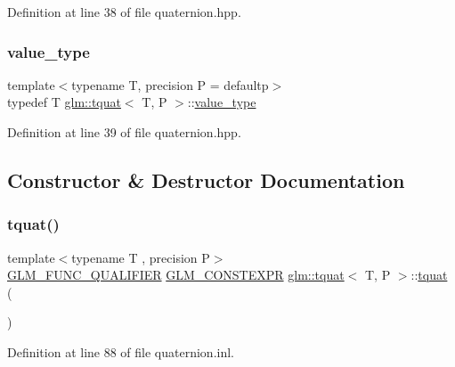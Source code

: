 Definition at line 38 of file quaternion.\+hpp.

\mbox{\label{structglm_1_1tquat_ab335d431872cb11fb3b5e2476adc32d8}} 
\subsubsection{\texorpdfstring{value\_type}{value\_type}}
{\footnotesize\ttfamily template$<$typename T, precision P = defaultp$>$ \\
typedef T \mbox{\hyperlink{structglm_1_1tquat}{glm\+::tquat}}$<$ T, P $>$\+::\mbox{\hyperlink{structglm_1_1tquat_ab335d431872cb11fb3b5e2476adc32d8}{value\+\_\+type}}}



Definition at line 39 of file quaternion.\+hpp.



\subsection{Constructor \& Destructor Documentation}
\mbox{\label{structglm_1_1tquat_ad45a7fd79d31014055fa749078b78cbf}} 
\subsubsection{\texorpdfstring{tquat()}{tquat()}\hspace{0.1cm}{\footnotesize\ttfamily [1/13]}}
{\footnotesize\ttfamily template$<$typename T , precision P$>$ \\
\mbox{\hyperlink{setup_8hpp_a33fdea6f91c5f834105f7415e2a64407}{G\+L\+M\+\_\+\+F\+U\+N\+C\+\_\+\+Q\+U\+A\+L\+I\+F\+I\+ER}} \mbox{\hyperlink{setup_8hpp_a08b807947b47031d3a511f03f89645ad}{G\+L\+M\+\_\+\+C\+O\+N\+S\+T\+E\+X\+PR}} \mbox{\hyperlink{structglm_1_1tquat}{glm\+::tquat}}$<$ T, P $>$\+::\mbox{\hyperlink{structglm_1_1tquat}{tquat}} (\begin{DoxyParamCaption}{ }\end{DoxyParamCaption})}



Definition at line 88 of file quaternion.\+inl.

